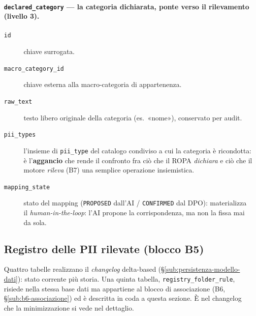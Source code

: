 \paragraph{\texttt{declared\_category} --- la categoria dichiarata, ponte verso il rilevamento (livello 3).}
\begin{description}
	\item[\texttt{id}] chiave surrogata.
	\item[\texttt{macro\_category\_id}] chiave esterna alla macro-categoria di appartenenza.
	\item[\texttt{raw\_text}] testo libero originale della categoria (es.\ «nome»), conservato per audit.
	\item[\texttt{pii\_types}] l'insieme di \texttt{pii\_type} del catalogo condiviso a cui la categoria è ricondotta: è l'\textbf{aggancio} che rende il confronto fra ciò che il ROPA \emph{dichiara} e ciò che il motore \emph{rileva} (B7) una semplice operazione insiemistica.
	\item[\texttt{mapping\_state}] stato del mapping (\texttt{PROPOSED} dall'AI / \texttt{CONFIRMED} dal DPO): materializza il \emph{human-in-the-loop}: l'AI propone la corrispondenza, ma non la fissa mai da sola.
\end{description}

\subsection{Registro delle PII rilevate (blocco B5)}
\label{sub:dati-registro-pii}

Quattro tabelle realizzano il \emph{changelog} delta-based (§\ref{sub:persistenza-modello-dati}): stato corrente più storia. Una quinta tabella, \texttt{registry\_folder\_rule}, risiede nella stessa base dati ma appartiene al blocco di associazione (B6, §\ref{sub:b6-associazione}) ed è descritta in coda a questa sezione. È nel changelog che la minimizzazione si vede nel dettaglio.

